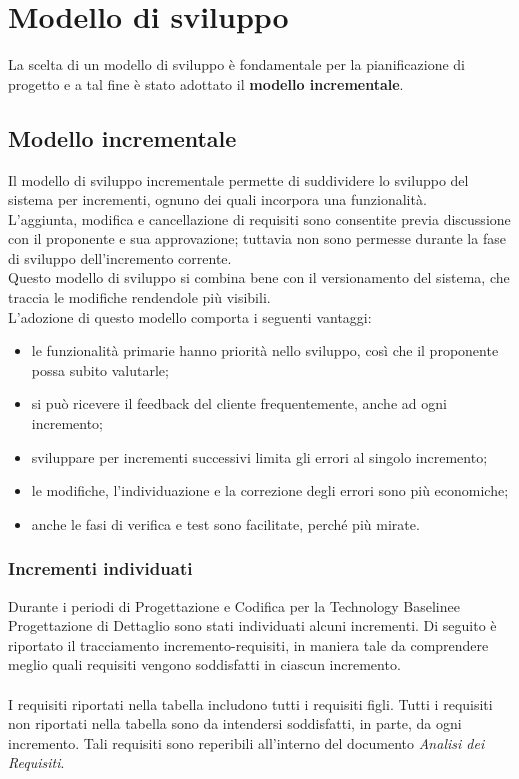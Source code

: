 \section{Modello di sviluppo}
La scelta di un modello di sviluppo è fondamentale per la pianificazione di 
progetto e a tal fine è stato adottato il \textbf{modello incrementale}.

\subsection{Modello incrementale}
Il modello di sviluppo incrementale permette di suddividere lo sviluppo del sistema per 
incrementi, ognuno dei quali incorpora una funzionalità. \\
L'aggiunta, modifica e cancellazione di requisiti sono consentite previa discussione con il proponente e sua 
approvazione; tuttavia non sono permesse durante la fase di sviluppo dell'incremento corrente.\\
Questo modello di sviluppo si combina bene con il versionamento del sistema, che traccia le modifiche rendendole più visibili.\\
L'adozione di questo modello comporta i seguenti vantaggi:
\begin{itemize}
	\item le funzionalità primarie hanno priorità nello sviluppo, così che il proponente possa subito valutarle;
	\item si può ricevere il feedback del cliente frequentemente, anche ad ogni incremento;
	\item sviluppare per incrementi successivi limita gli errori al singolo incremento;
	\item le modifiche, l'individuazione e la correzione degli errori sono più economiche;
	\item anche le fasi di verifica e test sono facilitate, perché più mirate.
\end{itemize}
\subsubsection{Incrementi individuati} Durante i periodi di Progettazione e Codifica per la Technology Baseline\glosp e Progettazione di Dettaglio sono stati individuati alcuni incrementi. Di seguito è riportato il tracciamento incremento-requisiti, in maniera tale da comprendere meglio quali requisiti vengono soddisfatti in ciascun incremento\glo. \\ \\
I requisiti riportati nella tabella includono tutti i requisiti figli. Tutti i requisiti non riportati nella tabella sono da intendersi soddisfatti, in parte, da ogni incremento. Tali requisiti sono reperibili all'interno del documento \textit{Analisi dei Requisiti}.

